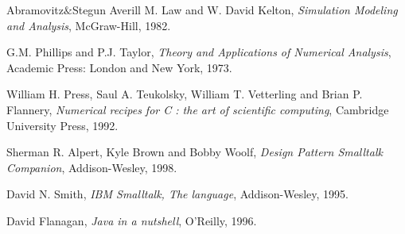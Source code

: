 \begin{thebibliography}{Abramovitz\thinspace$\&$\thinspace Stegun}
Averill M. Law and W. David Kelton, {\em Simulation Modeling and
Analysis}, McGraw-Hill, 1982.


G.M. Phillips and P.J. Taylor, {\em Theory and Applications of
Numerical Analysis}, Academic Press: London and New York, 1973.

William H. Press, Saul A. Teukolsky, William T. Vetterling
and Brian P. Flannery, {\em Numerical recipes for C : the art of
scientific computing}, Cambridge University Press, 1992.

Sherman R. Alpert, Kyle Brown and Bobby Woolf,
{\em Design Pattern Smalltalk Companion}, Addison-Wesley, 1998.

 David N. Smith,
{\em IBM Smalltalk, The language}, Addison-Wesley, 1995.

 David Flanagan,
{\em Java in a nutshell}, O'Reilly, 1996.

\end{thebibliography}

